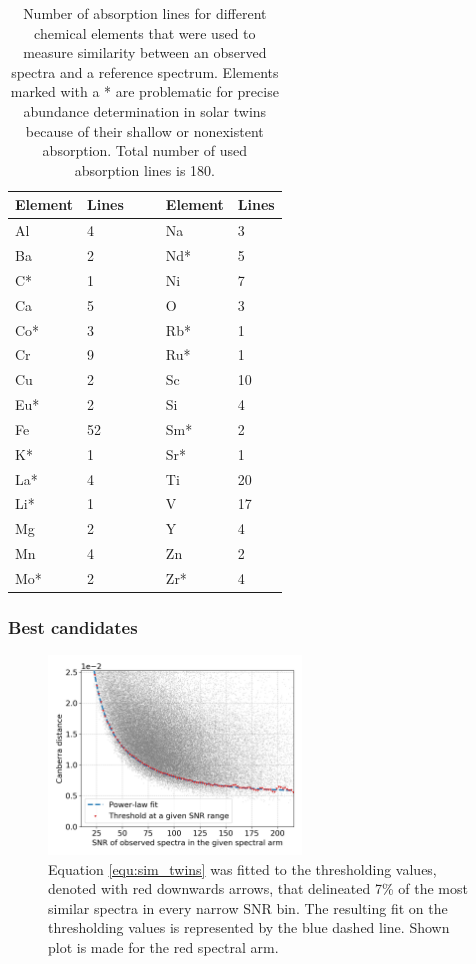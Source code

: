 \begin{table}
	\centering
	\caption{Number of absorption lines for different chemical elements that were used to measure similarity between an observed spectra and a reference spectrum. Elements marked with a * are problematic for precise abundance determination in solar twins because of their shallow or nonexistent absorption. Total number of used absorption lines is 180.}
	\begin{tabular}{l l c | c l l }
		\hline 
		Element & Lines & & & Element & Lines\\ 
		\hline \hline
		Al & 4 & & & Na & 3\\ 
		Ba & 2 & & & Nd* & 5\\ 
		C* & 1 & & & Ni & 7\\ 
		Ca & 5 & & & O & 3 \\ 
		Co* & 3 & & & Rb* & 1\\ 
		Cr & 9 & & & Ru* & 1\\ 
		Cu & 2 & & & Sc & 10\\ 
		Eu* & 2 & & & Si & 4\\ 
		Fe & 52 & & & Sm* & 2\\ 
		K* & 1 & & & Sr* & 1\\ 
		La* & 4 & & & Ti & 20\\ 
		Li* & 1 & & & V & 17\\ 
		Mg & 2 & & & Y & 4\\ 
		Mn & 4 & & & Zn & 2\\ 
		Mo* & 2 & & & Zr* & 4 \\ 
		\hline
	\end{tabular}
	\label{tab:elements_list}
\end{table}

\subsubsection{Best candidates}
\begin{figure}
	\centering
	\includegraphics[width=0.6\textwidth]{canberra_b3_07_envelope.png}
	\caption{Equation \ref{equ:sim_twins} was fitted to the thresholding values, denoted with red downwards arrows, that delineated 7\% of the most similar spectra in every narrow SNR bin. The resulting fit on the thresholding values is represented by the blue dashed line. Shown plot is made for the red spectral arm.}
	\label{fig:envelope_fit_twins}
\end{figure}

